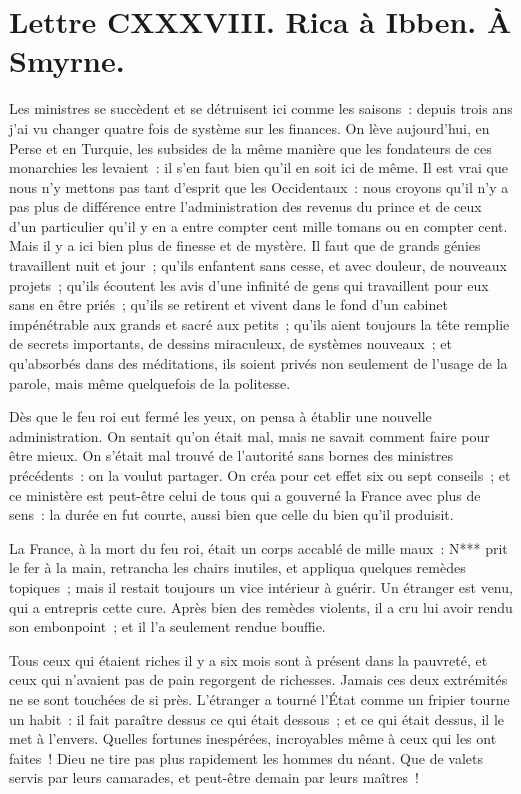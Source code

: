 \documentclass[french,twoside]{book} %
\newcommand{\dateline}[1]{\medskip{\RaggedLeft{#1}\par}\bigskip}
\begin{document}
\dateline{De Paris, le 6 de la lune de Chalval, 1719.}
\section[{Lettre CXXXVIII. Rica à Ibben. À Smyrne.}]{Lettre CXXXVIII. Rica à Ibben. À Smyrne.}\renewcommand{\leftmark}{Lettre CXXXVIII. Rica à Ibben. À Smyrne.}

\noindent Les ministres se succèdent et se détruisent ici comme les saisons : depuis trois ans j’ai vu changer quatre fois de système sur les finances. On lève aujourd’hui, en Perse et en Turquie, les subsides de la même manière que les fondateurs de ces monarchies les levaient : il s’en faut bien qu’il en soit ici de même. Il est vrai que nous n’y mettons pas tant d’esprit que les Occidentaux : nous croyons qu’il n’y a pas plus de différence entre l’administration des revenus du prince et de ceux d’un particulier qu’il y en a entre compter cent mille tomans ou en compter cent. Mais il y a ici bien plus de finesse et de mystère. Il faut que de grands génies travaillent nuit et jour ; qu’ils enfantent sans cesse, et avec douleur, de nouveaux projets ; qu’ils écoutent les avis d’une infinité de gens qui travaillent pour eux sans en être priés ; qu’ils se retirent et vivent dans le fond d’un cabinet impénétrable aux grands et sacré aux petits ; qu’ils aient toujours la tête remplie de secrets importants, de dessins miraculeux, de systèmes nouveaux ; et qu’absorbés dans des méditations, ils soient privés non seulement de l’usage de la parole, mais même quelquefois de la politesse.\par
Dès que le feu roi eut fermé les yeux, on pensa à établir une nouvelle administration. On sentait qu’on était mal, mais ne savait comment faire pour être mieux. On s’était mal trouvé de l’autorité sans bornes des ministres précédents : on la voulut partager. On créa pour cet effet six ou sept conseils ; et ce ministère est peut-être celui de tous qui a gouverné la France avec plus de sens : la durée en fut courte, aussi bien que celle du bien qu’il produisit.\par
La France, à la mort du feu roi, était un corps accablé de mille maux : N*** prit le fer à la main, retrancha les chairs inutiles, et appliqua quelques remèdes topiques ; mais il restait toujours un vice intérieur à guérir. Un étranger est venu, qui a entrepris cette cure. Après bien des remèdes violents, il a cru lui avoir rendu son embonpoint ; et il l’a seulement rendue bouffie.\par
Tous ceux qui étaient riches il y a six mois sont à présent dans la pauvreté, et ceux qui n’avaient pas de pain regorgent de richesses. Jamais ces deux extrémités ne se sont touchées de si près. L’étranger a tourné l’État comme un fripier tourne un habit : il fait paraître dessus ce qui était dessous ; et ce qui était dessus, il le met à l’envers. Quelles fortunes inespérées, incroyables même à ceux qui les ont faites ! Dieu ne tire pas plus rapidement les hommes du néant. Que de valets servis par leurs camarades, et peut-être demain par leurs maîtres !\par
\end{document}
